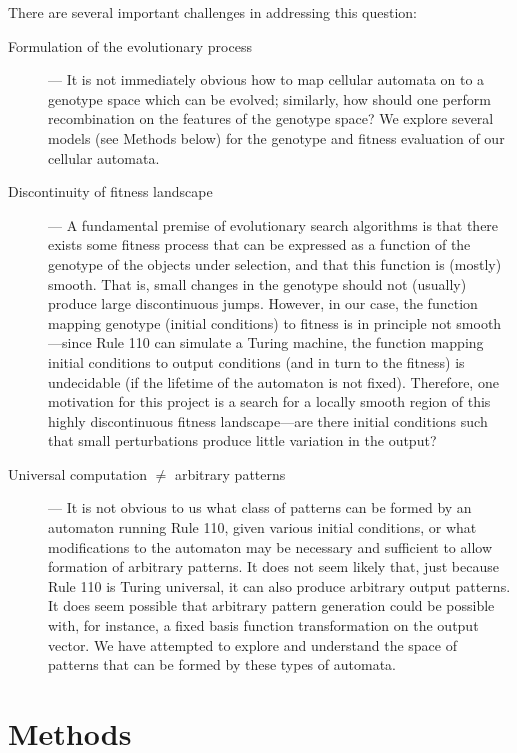 \documentclass[twocolumn]{article}
\begin{document}
There are several important challenges in addressing this question:
\begin{description}
\item[Formulation of the evolutionary process] --- It is not immediately obvious how to map cellular automata on to a genotype space which can be evolved; similarly, how should one perform recombination on the features of the genotype space? We explore several models (see Methods below) for the genotype and fitness evaluation of our cellular automata. 
\item[Discontinuity of fitness landscape] ---  A fundamental premise of evolutionary search algorithms is that there exists some fitness process that can be expressed as a function of the genotype of the objects under selection, and that this function is (mostly) smooth. That is, small changes in the genotype should not (usually) produce large discontinuous jumps. However, in our case, the function mapping genotype (initial conditions) to fitness is in principle not smooth---since Rule 110 can simulate a Turing machine, the function mapping initial conditions to output conditions (and in turn to the fitness) is undecidable (if the lifetime of the automaton is not fixed). Therefore, one motivation for this project is a search for a locally smooth region of this highly discontinuous fitness landscape---are there initial conditions such that small perturbations produce little variation in the output?
\item[Universal computation $\ne$ arbitrary patterns] --- It is not obvious to us what class of patterns can be formed by an automaton running Rule 110, given various initial conditions, or what modifications to the automaton may be necessary and sufficient to allow formation of arbitrary patterns. It does not seem likely that, just because Rule 110 is Turing universal, it can also produce arbitrary output patterns. It does seem possible that arbitrary pattern generation could be possible with, for instance, a fixed basis function transformation on the output vector. We have attempted to explore and understand the space of patterns that can be formed by these types of automata.
\end{description}


\section{Methods}
\end{document}
